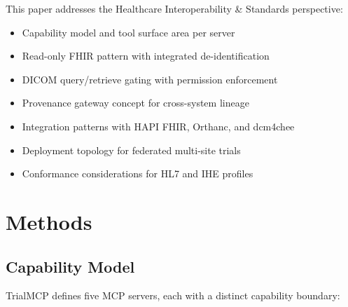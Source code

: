 \documentclass[10pt,letterpaper]{article}
\begin{document}
This paper addresses the Healthcare Interoperability \& Standards perspective:
\begin{itemize}[leftmargin=2em]
    \item Capability model and tool surface area per server
    \item Read-only FHIR pattern with integrated de-identification
    \item DICOM query/retrieve gating with permission enforcement
    \item Provenance gateway concept for cross-system lineage
    \item Integration patterns with HAPI FHIR, Orthanc, and dcm4chee
    \item Deployment topology for federated multi-site trials
    \item Conformance considerations for HL7 and IHE profiles
\end{itemize}

\section{Methods}

\subsection{Capability Model}

TrialMCP defines five MCP servers, each with a distinct capability boundary:
\end{document}
